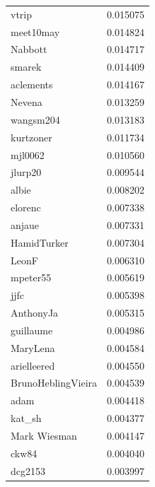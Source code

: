 \documentclass[9pt,lineno]{elife}
\begin{document}
\begin{appendixbox}
\begin{longtable}{lr}
vtrip                      &                  0.015075 \\
meet10may                  &                  0.014824 \\
Nabbott                    &                  0.014717 \\
smarek                     &                  0.014409 \\
aclements                  &                  0.014167 \\
Nevena                     &                  0.013259 \\
wangsm204                  &                  0.013183 \\
kurtzoner                  &                  0.011734 \\
mjl0062                    &                  0.010560 \\
jlurp20                    &                  0.009544 \\
albie                      &                  0.008202 \\
elorenc                    &                  0.007338 \\
anjaue                     &                  0.007331 \\
HamidTurker                &                  0.007304 \\
LeonF                      &                  0.006310 \\
mpeter55                   &                  0.005619 \\
jjfc                       &                  0.005398 \\
AnthonyJa                  &                  0.005315 \\
guillaume                  &                  0.004986 \\
MaryLena                   &                  0.004584 \\
arielleered                &                  0.004550 \\
BrunoHeblingVieira         &                  0.004539 \\
adam                       &                  0.004418 \\
kat\_sh                     &                  0.004377 \\
Mark Wiesman               &                  0.004147 \\
ckw84                      &                  0.004040 \\
dcg2153                    &                  0.003997 \\

\end{longtable}
\end{appendixbox}
\end{document}

